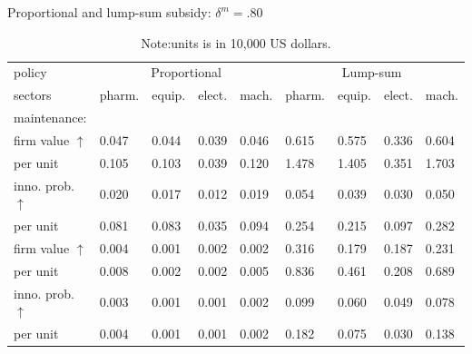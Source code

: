 \documentclass[11pt]{article}
\begin{document}
\clearpage 
\begin{table}[h!]
\caption{Proportional and lump-sum subsidy: $\delta^m=.80$}
\centering
\label{TD}
\small{
\begin{tabular}{lllllllll}
\toprule
policy             & \multicolumn{4}{c}{Proportional}                     & \multicolumn{4}{c}{Lump-sum}                         \\\cmidrule{2-9}
sectors                      & pharm. & equip. & elect. & mach. & pharm. & equip. & elect. & mach. \\
\hline 
maintenance:           &        &        &        &        &        &        &        &        \\
firm value $\uparrow$    & 0.047 & 0.044 & 0.039 & 0.046 & 0.615 & 0.575 & 0.336 & 0.604 \\
per unit &0.105 & 0.103 & 0.039 & 0.120 & 1.478 & 1.405 & 0.351 & 1.703 \\
inno. prob. $\uparrow$  &0.020 & 0.017 & 0.012 & 0.019 & 0.054 & 0.039 & 0.030 & 0.050 \\
per unit            &0.081 & 0.083 & 0.035 & 0.094 & 0.254 & 0.215 & 0.097 & 0.282 \\
firm value $\uparrow$       &0.004 & 0.001 & 0.002 & 0.002 & 0.316 & 0.179 & 0.187 & 0.231 \\
per unit            &0.008 & 0.002 & 0.002 & 0.005 & 0.836 & 0.461 & 0.208 & 0.689 \\
inno. prob. $\uparrow$  &0.003 & 0.001 & 0.001 & 0.002 & 0.099 & 0.060 & 0.049 & 0.078 \\
per unit            &0.004 & 0.001 & 0.001 & 0.002 & 0.182 & 0.075 & 0.030 & 0.138 \\ \bottomrule
\end{tabular}
}
\caption*{\footnotesize{}Note:units is in 10,000 US dollars.}{\small \par}
\end{table}
\clearpage 


\end{document}
